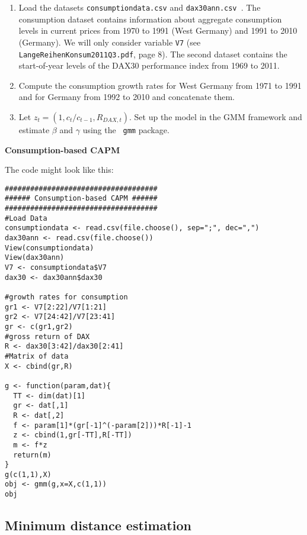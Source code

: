 \documentclass{article}
\begin{document}
\begin{enumerate}
\item Load the datasets \texttt{consumptiondata.csv} and \texttt{dax30ann.csv%
}. The consumption dataset contains information about aggregate consumption
levels in current prices from 1970 to 1991 (West Germany) and 1991 to 2010
(Germany). We will only consider variable \texttt{V7} (see \texttt{%
LangeReihenKonsum2011Q3.pdf}, page 8). The second dataset contains the
start-of-year levels of the DAX30 performance index from 1969 to 2011.

\item Compute the consumption growth rates for West Germany from 1971 to
1991 and for Germany from 1992 to 2010 and concatenate them.

\item Let $z_{t}=\left( 1,c_{t}/c_{t-1},R_{DAX,t}\right) $. Set up the model
in the GMM framework and estimate $\beta $ and $\gamma $ using the \texttt{%
gmm} package.
\end{enumerate}

\begin{solution}
\textbf{Consumption-based CAPM}

The code might look like this:
\begin{verbatim}
####################################
###### Consumption-based CAPM ######
####################################
#Load Data
consumptiondata <- read.csv(file.choose(), sep=";", dec=",")
dax30ann <- read.csv(file.choose())
View(consumptiondata)
View(dax30ann)
V7 <- consumptiondata$V7
dax30 <- dax30ann$dax30

#growth rates for consumption
gr1 <- V7[2:22]/V7[1:21]
gr2 <- V7[24:42]/V7[23:41]
gr <- c(gr1,gr2)
#gross return of DAX
R <- dax30[3:42]/dax30[2:41]
#Matrix of data
X <- cbind(gr,R)

g <- function(param,dat){
  TT <- dim(dat)[1]
  gr <- dat[,1]
  R <- dat[,2]
  f <- param[1]*(gr[-1]^(-param[2]))*R[-1]-1
  z <- cbind(1,gr[-TT],R[-TT])
  m <- f*z
  return(m)
}
g(c(1,1),X)
obj <- gmm(g,x=X,c(1,1))
obj
\end{verbatim}
\end{solution}

\subsection{Minimum distance estimation}
\end{document}
